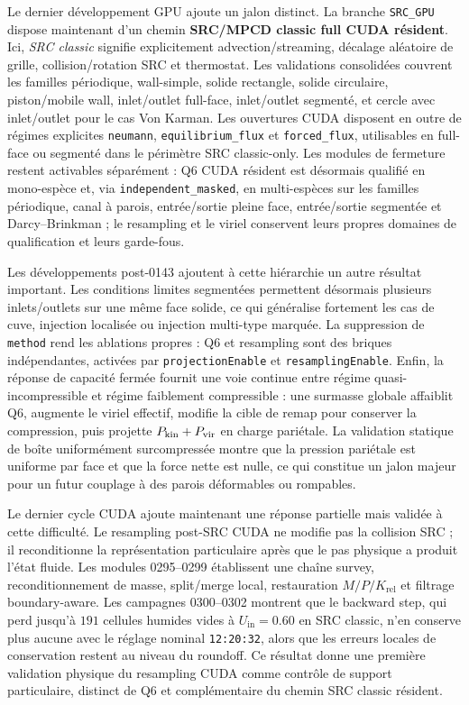 \documentclass[11pt,a4paper]{article}
\begin{document}
Le dernier développement GPU ajoute un jalon distinct. La branche \texttt{SRC\_GPU} dispose maintenant d'un chemin \textbf{SRC/MPCD classic full CUDA résident}. Ici, \emph{SRC classic} signifie explicitement advection/streaming, décalage aléatoire de grille, collision/rotation SRC et thermostat. Les validations consolidées couvrent les familles périodique, wall-simple, solide rectangle, solide circulaire, piston/mobile wall, inlet/outlet full-face, inlet/outlet segmenté, et cercle avec inlet/outlet pour le cas Von Karman. Les ouvertures CUDA disposent en outre de régimes explicites \texttt{neumann}, \texttt{equilibrium\_flux} et \texttt{forced\_flux}, utilisables en full-face ou segmenté dans le périmètre SRC classic-only. Les modules de fermeture restent activables séparément : Q6 CUDA résident est désormais qualifié en mono-espèce et, via \texttt{independent\_masked}, en multi-espèces sur les familles périodique, canal à parois, entrée/sortie pleine face, entrée/sortie segmentée et Darcy--Brinkman ; le resampling et le viriel conservent leurs propres domaines de qualification et leurs garde-fous.

Les développements post-0143 ajoutent à cette hiérarchie un autre résultat important. Les conditions limites segmentées permettent désormais plusieurs inlets/outlets sur une même face solide, ce qui généralise fortement les cas de cuve, injection localisée ou injection multi-type marquée. La suppression de \texttt{method} rend les ablations propres : Q6 et resampling sont des briques indépendantes, activées par \texttt{projectionEnable} et \texttt{resamplingEnable}. Enfin, la réponse de capacité fermée fournit une voie continue entre régime quasi-incompressible et régime faiblement compressible : une surmasse globale affaiblit Q6, augmente le viriel effectif, modifie la cible de remap pour conserver la compression, puis projette \(P_{\rm kin}+P_{\rm vir}\) en charge pariétale. La validation statique de boîte uniformément surcompressée montre que la pression pariétale est uniforme par face et que la force nette est nulle, ce qui constitue un jalon majeur pour un futur couplage à des parois déformables ou rompables.



Le dernier cycle CUDA ajoute maintenant une réponse partielle mais validée à cette difficulté. Le resampling post-SRC CUDA ne modifie pas la collision SRC ; il reconditionne la représentation particulaire après que le pas physique a produit l'état fluide. Les modules 0295--0299 établissent une chaîne survey, reconditionnement de masse, split/merge local, restauration $M/P/K_{\mathrm{rel}}$ et filtrage boundary-aware. Les campagnes 0300--0302 montrent que le backward step, qui perd jusqu'à $191$ cellules humides vides à $U_{\mathrm{in}}=0.60$ en SRC classic, n'en conserve plus aucune avec le réglage nominal \texttt{12:20:32}, alors que les erreurs locales de conservation restent au niveau du roundoff. Ce résultat donne une première validation physique du resampling CUDA comme contrôle de support particulaire, distinct de Q6 et complémentaire du chemin SRC classic résident.
\end{document}
